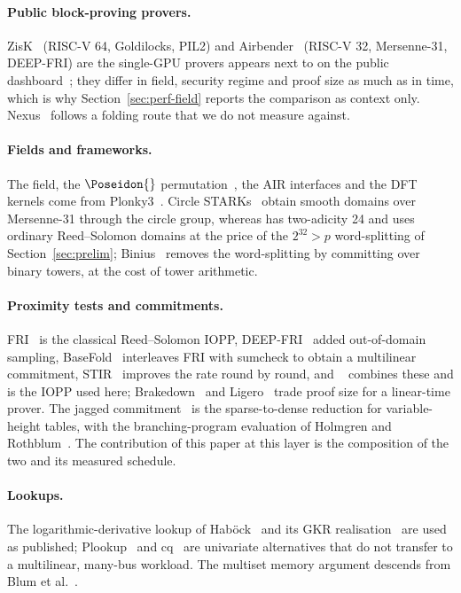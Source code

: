 \paragraph{Public block-proving provers.} ZisK~\citep{zisk} (RISC-V 64, Goldilocks, PIL2) and Airbender~\citep{airbender} (RISC-V 32, Mersenne-31, DEEP-FRI) are the single-GPU provers \Ziren{} appears next to on the public dashboard~\citep{ethproofs}; they differ in field, security regime and proof size as much as in time, which is why Section~\ref{sec:perf-field} reports the comparison as context only. Nexus~\citep{nexus} follows a folding route that we do not measure against.

\paragraph{Fields and frameworks.} The field, the $\Poseidon{}$ permutation~\citep{poseidon2}, the AIR interfaces and the DFT kernels come from Plonky3~\citep{plonky3}. Circle STARKs~\citep{circle-starks} obtain smooth domains over Mersenne-31 through the circle group, whereas \KB{} has two-adicity 24 and uses ordinary Reed--Solomon domains at the price of the $2^{32} > p$ word-splitting of Section~\ref{sec:prelim}; Binius~\citep{binius,fri-binius} removes the word-splitting by committing over binary towers, at the cost of tower arithmetic.

\paragraph{Proximity tests and commitments.} FRI~\citep{ben2018fast} is the classical Reed--Solomon IOPP, DEEP-FRI~\citep{deep-fri} added out-of-domain sampling, BaseFold~\citep{basefold} interleaves FRI with sumcheck to obtain a multilinear commitment, STIR~\citep{stir} improves the rate round by round, and \WHIR{}~\citep{whir} combines these and is the IOPP used here; Brakedown~\citep{brakedown} and Ligero~\citep{ligero} trade proof size for a linear-time prover. The jagged commitment~\citep{jagged-pcs} is the sparse-to-dense reduction for variable-height tables, with the branching-program evaluation of Holmgren and Rothblum~\citep{hr18}. The contribution of this paper at this layer is the composition of the two and its measured schedule.

\paragraph{Lookups.} The logarithmic-derivative lookup of Hab\"ock~\citep{haboeck} and its GKR realisation~\citep{logup-gkr} are used as published; Plookup~\citep{plookup} and cq~\citep{cq} are univariate alternatives that do not transfer to a multilinear, many-bus workload. The multiset memory argument descends from Blum et al.~\citep{blum1994}.

